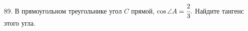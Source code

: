 89. В прямоугольном треугольнике угол $C$ прямой, $\cos \angle A=\cfrac{2}{3}.$ Найдите тангенс этого угла.\\
